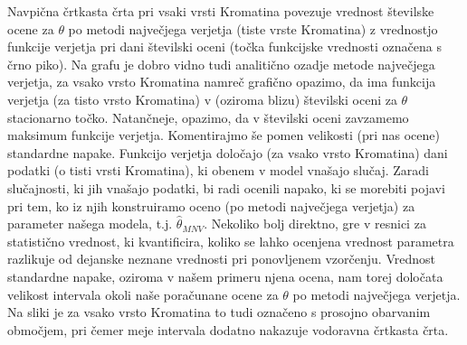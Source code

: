 \documentclass{article}
\begin{document}
Navpična črtkasta črta pri vsaki vrsti Kromatina povezuje vrednost številske ocene za $\theta$ po metodi največjega verjetja (tiste vrste Kromatina) z vrednostjo funkcije verjetja pri dani številski oceni (točka funkcijske vrednosti označena s črno piko).
Na grafu je dobro vidno tudi analitično ozadje metode največjega verjetja, za vsako vrsto Kromatina namreč grafično opazimo, da ima funkcija verjetja (za tisto vrsto Kromatina) v (oziroma blizu) številski oceni za $\theta$ stacionarno točko. 
Natančneje, opazimo, da v številski oceni zavzamemo maksimum funkcije verjetja.
\newline 
Komentirajmo še pomen velikosti (pri nas ocene) standardne napake. Funkcijo verjetja določajo (za vsako vrsto Kromatina) dani podatki (o tisti vrsti Kromatina), ki obenem v model vnašajo slučaj. 
Zaradi slučajnosti, ki jih vnašajo podatki, bi radi ocenili napako, ki se morebiti pojavi pri tem, ko iz njih konstruiramo oceno (po metodi največjega verjetja) za parameter našega modela, t.j. $\hat{\theta}_{MNV}$.
Nekoliko bolj direktno, gre v resnici za statistično vrednost, ki kvantificira, koliko se lahko ocenjena vrednost parametra razlikuje od dejanske neznane vrednosti pri ponovljenem vzorčenju.
Vrednost standardne napake, oziroma v našem primeru njena ocena, nam torej določata velikost intervala okoli naše poračunane ocene za $\theta$ po metodi največjega verjetja. Na sliki je za vsako vrsto Kromatina to tudi označeno s prosojno obarvanim območjem, pri čemer meje intervala dodatno nakazuje vodoravna črtkasta črta. 
\end{document}
